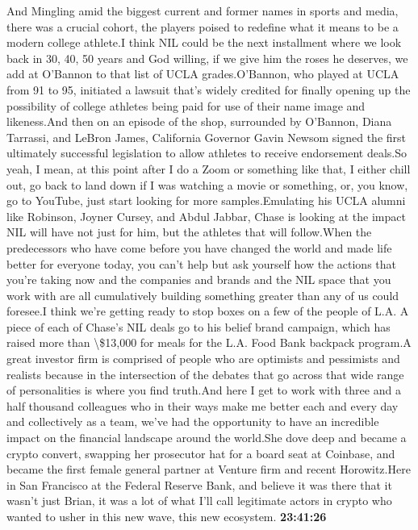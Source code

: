 \documentclass{article}%
\begin{document}
And Mingling amid the biggest current and former names in sports and media, there was a crucial cohort, the players poised to redefine what it means to be a modern college athlete.I think NIL could be the next installment where we look back in 30, 40, 50 years and God willing, if we give him the roses he deserves, we add at O'Bannon to that list of UCLA grades.O'Bannon, who played at UCLA from 91 to 95, initiated a lawsuit that's widely credited for finally opening up the possibility of college athletes being paid for use of their name image and likeness.And then on an episode of the shop, surrounded by O'Bannon, Diana Tarrassi, and LeBron James, California Governor Gavin Newsom signed the first ultimately successful legislation to allow athletes to receive endorsement deals.So yeah, I mean, at this point after I do a Zoom or something like that, I either chill out, go back to land down if I was watching a movie or something, or, you know, go to YouTube, just start looking for more samples.Emulating his UCLA alumni like Robinson, Joyner Cursey, and Abdul Jabbar, Chase is looking at the impact NIL will have not just for him, but the athletes that will follow.When the predecessors who have come before you have changed the world and made life better for everyone today, you can't help but ask yourself how the actions that you're taking now and the companies and brands and the NIL space that you work with are all cumulatively building something greater than any of us could foresee.I think we're getting ready to stop boxes on a few of the people of L.A. A piece of each of Chase's NIL deals go to his belief brand campaign, which has raised more than \textbackslash{}\$13,000 for meals for the L.A. Food Bank backpack program.A great investor firm is comprised of people who are optimists and pessimists and realists because in the intersection of the debates that go across that wide range of personalities is where you find truth.And here I get to work with three and a half thousand colleagues who in their ways make me better each and every day and collectively as a team, we've had the opportunity to have an incredible impact on the financial landscape around the world.She dove deep and became a crypto convert, swapping her prosecutor hat for a board seat at Coinbase, and became the first female general partner at Venture firm and recent Horowitz.Here in San Francisco at the Federal Reserve Bank, and believe it was there that it wasn't just Brian, it was a lot of what I'll call legitimate actors in crypto who wanted to usher in this new wave, this new ecosystem.%
\textbf{23:41:26}%
\end{document}
